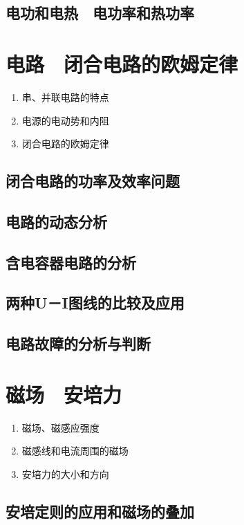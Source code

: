 \documentclass[cn,11pt, simple]{elegantbook}
\begin{document}
\clearpage\section{电功和电热　电功率和热功率}
\chapter{电路　闭合电路的欧姆定律}
\begin{enumerate}
   \item 串、并联电路的特点
   \item 电源的电动势和内阻
   \item 闭合电路的欧姆定律
\end{enumerate}

\clearpage\section{闭合电路的功率及效率问题}

\clearpage\section{电路的动态分析}

\clearpage\section{含电容器电路的分析}

\clearpage\section{两种U－I图线的比较及应用}

\clearpage\section{电路故障的分析与判断}
\chapter{磁场　安培力}
\begin{enumerate}
   \item 磁场、磁感应强度
   \item 磁感线和电流周围的磁场
   \item 安培力的大小和方向
\end{enumerate}

\clearpage\section{安培定则的应用和磁场的叠加}
\end{document}
